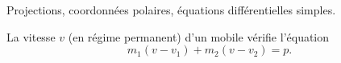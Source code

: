 \debutFicheEntrainement                                                                      %




\begin{prerequis}
	Projections, coordonnées polaires, équations différentielles simples.
\end{prerequis}












\hauteurLargeurCadreReponse		{1cm}{4.4cm}
\initialisationEntrainement


\debutEntrainement

	La vitesse $v$ (en régime permanent) d'un mobile vérifie l'équation
	\[
	m_1(v-v_1) + m_2(v-v_2) = p.
	\]

